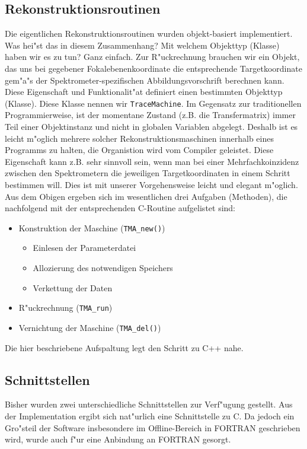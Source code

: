 \subsection {Rekonstruktionsroutinen}

Die eigentlichen Rekonstruktionsroutinen wurden objekt-basiert \cite{booch91}
implementiert.
Was hei"st das in diesem Zusammenhang? Mit welchem Objekttyp (Klasse) haben wir
es zu tun?
Ganz einfach. Zur R"uckrechnung brauchen wir ein Objekt, das uns bei
gegebener Fokalebenenkoordinate die entsprechende Targetkoordinate 
gem"a"s der Spektrometer-spezifischen Abbildungsvorschrift berechnen kann.
Diese Eigenschaft und Funktionalit"at definiert einen bestimmten 
Objekttyp (Klasse). Diese Klasse nennen wir {\tt TraceMachine}. 
Im Gegensatz zur traditionellen Programmierweise, ist 
der momentane Zustand (z.B. die Transfermatrix) immer Teil einer Objektinstanz 
und nicht in globalen Variablen abgelegt. 
Deshalb ist es leicht m"oglich mehrere solcher 
Rekonstruktionsmaschinen innerhalb eines Programms zu halten, die 
Organistion wird vom Compiler geleistet. 
Diese Eigenschaft kann z.B. sehr sinnvoll sein, wenn man bei einer 
Mehrfachkoinzidenz zwischen den Spektrometern die jeweiligen  Targetkoordinaten
in einem Schritt bestimmen will. 
Dies ist mit unserer Vorgehensweise leicht und elegant m"oglich.
Aus dem Obigen ergeben sich im wesentlichen drei Aufgaben (Methoden), die
nachfolgend mit der entsprechenden C-Routine aufgelistet sind:
\begin{itemize}
\item Konstruktion der Maschine ({\tt TMA\_new()})
        \begin{itemize}
                \item Einlesen der Parameterdatei
                \item Allozierung des notwendigen Speichers
                \item Verkettung der Daten 
        \end{itemize}
\item R"uckrechnung ({\tt TMA\_run})
\item Vernichtung der Maschine ({\tt TMA\_del()})
\end{itemize}
Die hier beschriebene Aufspaltung legt den Schritt zu C++ nahe.

\subsection{Schnittstellen}
Bisher wurden zwei unterschiedliche Schnittstellen \cite{tmainfo}
zur Verf"ugung gestellt. Aus der 
Implementation ergibt sich nat"urlich eine Schnittstelle  zu C. Da jedoch
ein Gro"steil der Software insbesondere im  Offline-Bereich in
FORTRAN geschrieben wird, wurde auch f"ur eine Anbindung an FORTRAN gesorgt.

